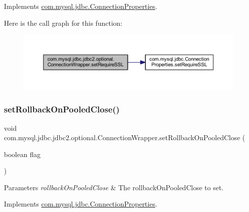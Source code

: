 Implements \mbox{\hyperlink{interfacecom_1_1mysql_1_1jdbc_1_1_connection_properties_a8ed305ab3368867b5a6cc1cc0bf67ba2}{com.\+mysql.\+jdbc.\+Connection\+Properties}}.

Here is the call graph for this function\+:
\nopagebreak
\begin{figure}[H]
\begin{center}
\leavevmode
\includegraphics[width=350pt]{classcom_1_1mysql_1_1jdbc_1_1jdbc2_1_1optional_1_1_connection_wrapper_a7aced035eee3e3d7402a549b608e391b_cgraph}
\end{center}
\end{figure}
\mbox{\label{classcom_1_1mysql_1_1jdbc_1_1jdbc2_1_1optional_1_1_connection_wrapper_a9d43b30760d413e9c1278f85a7f63349}} 
\subsubsection{\texorpdfstring{set\+Rollback\+On\+Pooled\+Close()}{setRollbackOnPooledClose()}}
{\footnotesize\ttfamily void com.\+mysql.\+jdbc.\+jdbc2.\+optional.\+Connection\+Wrapper.\+set\+Rollback\+On\+Pooled\+Close (\begin{DoxyParamCaption}\item[{boolean}]{flag }\end{DoxyParamCaption})}


\begin{DoxyParams}{Parameters}
{\em rollback\+On\+Pooled\+Close} & The rollback\+On\+Pooled\+Close to set. \\
\hline
\end{DoxyParams}


Implements \mbox{\hyperlink{interfacecom_1_1mysql_1_1jdbc_1_1_connection_properties_ac8700288ba51d4baf2062fa2a2856b88}{com.\+mysql.\+jdbc.\+Connection\+Properties}}.


